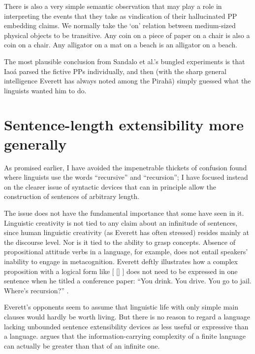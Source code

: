 \documentclass[output=paper,colorlinks,citecolor=brown
]{langscibook}
\begin{document}
There is also a very simple semantic observation that may play a
role in interpreting the events that they take as vindication of their
hallucinated PP embedding claims. We normally take the `on' relation
between medium-sized physical objects to be transitive. Any coin on
a piece of paper on a chair is also a coin on a chair. Any alligator
on a mat on a beach is an alligator on a beach.

The most plausible conclusion from Sandalo et al.'s bungled experiments
is that Iao{\'a} parsed the fictive PPs individually, and then (with the
sharp general intelligence Everett has always noted among the Pirah{\~a})
simply guessed what the linguists wanted him to do.

\section{Sentence-length extensibility more generally}

As promised earlier, I have avoided the impenetrable thickets of confusion
found where linguists use the words ``recursive'' and ``recursion''; I have
focused instead on the clearer issue of syntactic devices that can in
principle allow the construction of sentences of arbitrary length.

The issue does not have the fundamental importance that some have seen
in it. Linguistic creativity is not tied to any claim about an infinitude
of sentences, since human linguistic creativity (as Everett has often
stressed) resides mainly at the discourse level.
Nor is it tied to the ability to grasp concepts.
Absence of propositional attitude verbs in a language, for example,
does not entail speakers' inability to engage in metacognition.
Everett deftly illustrates how a complex proposition with a logical
form like [ [] ]  does not need
to be expressed in one sentence when he titled a conference paper:
``You drink. You drive. You go to jail. Where's recursion?''
\citep{Everett10}.

Everett's opponents seem to assume that linguistic life with only
simple main clauses would hardly be worth living.
But there is no reason to regard a language lacking unbounded sentence
extensibility devices as less useful or expressive than a language.
\citet{Kornai14} argues that the information-carrying complexity of
a finite language can actually be greater than that of an infinite one.
\end{document}
